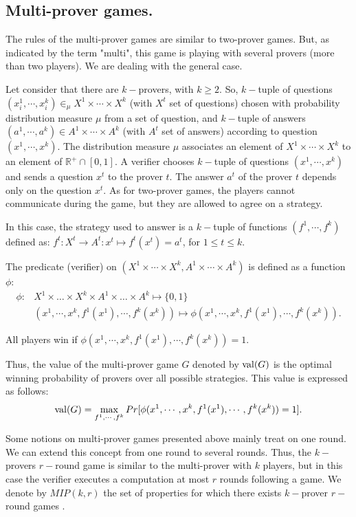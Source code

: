 \subsection{Multi-prover games.} The rules of the multi-prover games are similar to two-prover games. But, as indicated by the term "multi", this game is playing with several provers (more than two players). We are dealing with the general case.

Let consider that there are $k-$provers, with $k \geq 2$. So, $k-$tuple of questions $(x_i^1, \cdots , x_i^k) \in_{\mu}  X^1  \times \cdots \times X^k $ (with $X^t$ set of questions)  chosen with probability distribution measure $\mu $ from a set of question, and $k-$tuple of answers $(a^1, \cdots , a^k)  \in A^1 \times \cdots \times A^k$ (with $A^t$ set of answers) according to question $(x^1, \cdots , x^k).$ The distribution measure $\mu $ associates an element of $ X^1  \times \cdots \times X^k $ to an element of $\mathbb{R}^+ \cap [0,1].$ A verifier chooses $k-$tuple of questions $(x^1, \cdots , x^k)$ and sends a question $x^t$ to the prover $t$. The answer $a^t$ of the prover $t$ depends only on the question $x^t.$ As for two-prover games, the players cannot communicate during the game, but they are allowed to agree on a strategy. 

In this case, the strategy used to answer is a $k-$tuple of functions $(f^1, \cdots , f^k)$ defined as:
$f^t: X^t \longrightarrow A^t: x^t \longmapsto f^t(x^t)=a^t$, for $1\leq t \leq k.$

The predicate (verifier) on $( X^1 \times \cdots \times X^k, A^1 \times \cdots \times A^k)$ is defined as a function $\phi$:
\begin{align*}
\phi : & X^1 \times \ldots \times X^k \times A^1 \times \ldots \times A^k \longmapsto \{0,1\} \\
& (x^1, \cdots , x^k, f^1(x^1), \cdots , f^k(x^k)) \longmapsto \phi (x^1, \cdots , x^k, f^1(x^1), \cdots , f^k(x^k)).
\end{align*}

All players win if $\phi (x^1, \cdots , x^k, f^1(x^1), \cdots , f^k(x^k))=1.$ 

Thus, the value of the multi-prover game $G$ denoted by $\mathrm{val} (G)$ is  the optimal winning probability of provers over all possible strategies. This value is expressed as follows:
$$\mathrm{val} (G)= \max_{f^1, \cdots , f^k} Pr[\phi (x^1, \cdots , x^k, f^1(x^1), \cdots , f^k(x^k))=1].$$


Some notions on multi-prover games presented above  mainly treat on one round. We can extend this concept from one round to several rounds. Thus, the $k-$provers $r-$round game is similar to the multi-prover with $k$ players, but in this case the verifier executes a computation at most $r$ rounds following a game. We denote  by $MIP(k,r)$ the set of properties for which there exists $k-$prover $r-$round games  \citep{ben1988multi,tamaki2015parallel}.




